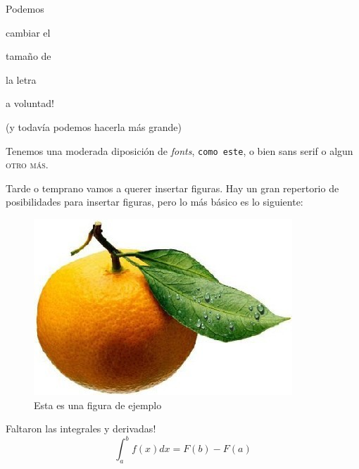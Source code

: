 \documentclass[12pt,a4paper]{article}
\begin{document}
Podemos\begin{large} cambiar el \end{large} \begin{Large}tamaño de                                           \end{Large} \begin{LARGE}la letra \end{LARGE} \begin{huge}a voluntad!  \end{huge} \begin{footnotesize}(y todavía podemos hacerla más grande) \end{footnotesize}

\vspace{5mm}

Tenemos una moderada diposici\'on de \textit{fonts}, \texttt{como este}, o bien \textsf{sans serif} o algun \textsc{otro m\'as}.

\vspace{5mm}

Tarde o temprano vamos a querer insertar figuras. Hay un gran repertorio de posibilidades para insertar figuras, pero lo m\'as b\'asico es lo siguiente:

\begin{figure}[H] %
\centering %
\includegraphics[totalheight=0.22\textheight]{imagenes/mandarina.jpg} %
\caption{\small  Esta es una figura de ejemplo }
\label{mandarina} 
\end{figure}


Faltaron las integrales y derivadas!
\begin{equation}
    \int_a^b f(x) dx = F(b)-F(a)
\end{equation}
\end{document}
